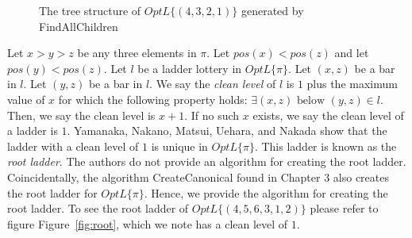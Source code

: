 \begin{figure}[h]
	\caption{The tree structure of $OptL\{(4,3,2,1)\}$ generated by {\sc FindAllChildren}}
	\label{Fig:TreeFAC}
\end{figure}
\pagebreak
Let $x>y>z$ be any three elements in $\pi$. 
Let $pos(x) < pos(z)$ and let $pos(y) < pos(z)$. 
Let $l$ be a ladder lottery in $OptL\{\pi\}$. 
Let $(x,z)$ be a  bar in $l$. Let $(y,z)$ 
be a bar in $l$. We say the \emph{clean level} of $l$ is $1$ 
plus the maximum value of $x$ for which the following property holds: $\exists (x,z) \text{ below } (y,z) \in l$. 
Then, we say the clean level is $x+1$. If no such $x$ exists, we say the clean level of a ladder is $1$. 
Yamanaka, Nakano, Matsui, Uehara, and Nakada show that the ladder with a clean level of $1$ is unique in $OptL\{\pi\}$. This ladder 
is known as the \emph{root ladder}. The authors do not provide an algorithm for creating the root ladder. 
Coincidentally, the algorithm {\sc CreateCanonical} found in Chapter 3 also creates the root ladder for $OptL\{\pi\}$. 
Hence, we provide the algorithm for creating the root ladder.
To see the root ladder of $OptL\{(4,5,6,3,1,2)\}$ please refer to figure Figure~\ref{fig:root}, which we note has a clean level of $1$.  

